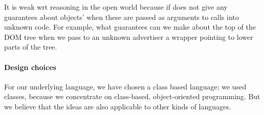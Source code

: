 It is weak wrt reasoning in the open world because if does not give any guarantees about objects' when
these are passed as arguments to calls into unknown code. For example, what  guarantees  
can we make about the top of the DOM tree when we pass  to an unknown advertiser a wrapper 
pointing to lower parts of the tree.

\paragraph{Design choices}
For our underlying language, we have chosen a class based language; 
we used classes, because we concentrate on class-based, object-oriented
programming. But  we believe that the ideas are also applicable to
other kinds of languages.  

